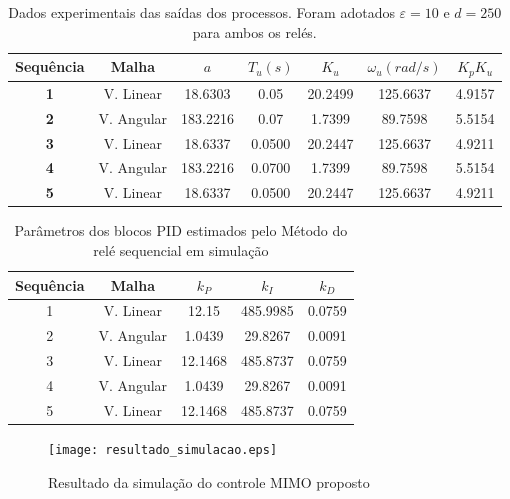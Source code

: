 \begin{table}[!htb]
	\centering
	\caption{\label{tab:k_u2}Dados experimentais das saídas dos processos. Foram adotados $\varepsilon=10$  e $d=250$ para ambos os relés.}
		
	\begin{tabular}{c|c|ccccc}
	\textbf{Sequência} & Malha & $a$ & $T_u (s)$ & $K_u$ & $\omega_u (rad/s)$ & $K_pK_u$\\ 
	\hline 
	\textbf{1} & V. Linear & 18.6303 & 0.05 & 20.2499 & 125.6637 & 4.9157 \\ 
	\hline 
	\textbf{2} & V. Angular & 183.2216 & 0.07 & 1.7399 & 89.7598 &  5.5154\\ 
	\hline
	\textbf{3} & V. Linear & 18.6337 & 0.0500 & 20.2447 & 125.6637 & 4.9211\\ 
	\hline 
	\textbf{4} & V. Angular & 183.2216 & 0.0700 & 1.7399 & 89.7598 & 5.5154\\ 
	\hline
	\textbf{5} & V. Linear & 18.6337 & 0.0500 & 20.2447 & 125.6637 & 4.9211\\ 
	\end{tabular} 
	
\end{table}

\begin{table}[!htb]
	\centering
	\caption{\label{tab:PID_siso_simulador}Parâmetros dos blocos PID estimados pelo Método do relé sequencial em simulação}
	\begin{tabular}{c|cccc}
	Sequência & Malha & $k_P$ & $k_I$ & $k_D$ \\ 
	\hline 
	1 & V. Linear & 12.15 & 485.9985 & 0.0759 \\ 
	\hline 
	2 & V. Angular & 1.0439 & 29.8267 & 0.0091 \\ 
	\hline 
	3 & V. Linear & 12.1468 & 485.8737 & 0.0759 \\ 
	\hline 
	4 & V. Angular & 1.0439 & 29.8267 & 0.0091 \\ 
	\hline 
	5 & V. Linear & 12.1468 & 485.8737 & 0.0759 \\ 
	\end{tabular} 
	
\end{table}

\begin{figure}[!htb]
	\caption{\label{fig:resultado_controle_simulink_rele}Resultado da simulação do controle MIMO proposto}
	\begin{center}
		\texttt{[image: resultado\_simulacao.eps]}
	\end{center}
\end{figure}



